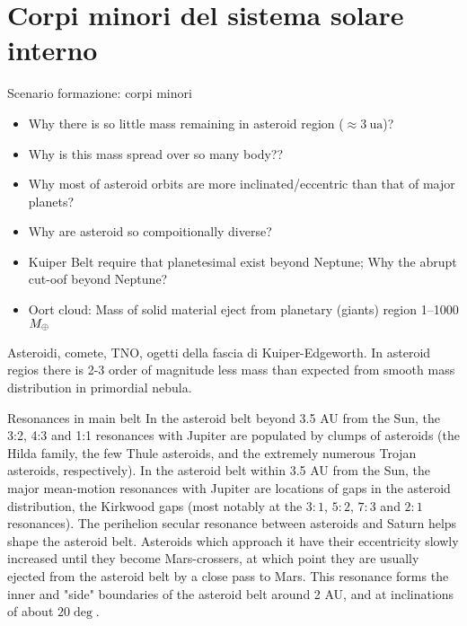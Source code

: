 \section{Corpi minori del sistema solare interno}

\begin{frame}{Scenario formazione: corpi minori}
\begin{itemize}
\item Why there is so little mass remaining in asteroid region ($\approx\SI{3}{\astronomicalunit}$)? 
\item Why is this mass spread over so many body??
\item Why most of asteroid orbits are more inclinated/eccentric than that of major planets?
\item Why are asteroid so compoitionally diverse?
\item Kuiper Belt require that planetesimal exist beyond Neptune; Why the abrupt cut-oof beyond Neptune?
\item Oort cloud: Mass of solid material eject from planetary (giants) region \numrange{1}{1000}$M_{\oplus}{}$
\end{itemize}

\end{frame}

\begin{wordonframe}{Asteroidi, comete, TNO, ogetti della fascia di Kuiper-Edgeworth.}
In asteroid regios there is 2-3 order of magnitude less mass than expected from smooth mass distribution in primordial nebula.
\end{wordonframe}

\begin{frame}{Resonances in main belt}
In the asteroid belt beyond 3.5 AU from the Sun, the 3:2, 4:3 and 1:1 resonances with Jupiter are populated by clumps of asteroids (the Hilda family, the few Thule asteroids, and the extremely numerous Trojan asteroids, respectively).
In the asteroid belt within 3.5 AU from the Sun, the major mean-motion resonances with Jupiter are locations of gaps in the asteroid distribution, the Kirkwood gaps (most notably at the $3:1$, $5:2$, $7:3$ and $2:1$ resonances).
The perihelion secular resonance between asteroids and Saturn  helps shape the asteroid belt. Asteroids which approach it have their eccentricity slowly increased until they become Mars-crossers, at which point they are usually ejected from the asteroid belt by a close pass to Mars. This resonance forms the inner and "side" boundaries of the asteroid belt around 2 AU, and at inclinations of about $20\deg$.
\end{frame}


